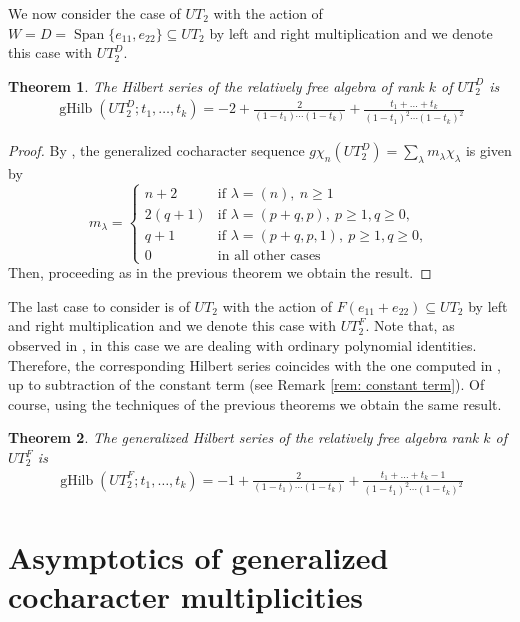 \documentclass{article}
\newtheorem{theorem}{Theorem}[section]
\DeclareMathOperator{\spn}{Span}
\DeclareMathOperator{\Hilb}{gHilb}
\begin{document}
We now consider the case of $UT_2$ with the action of $W=D=\spn\{e_{11},e_{22}\}\subseteq UT_2$ by left and right multiplication and we denote this case with $UT_2^D$.

\begin{theorem}
	The Hilbert series of the relatively free algebra of rank $k$ of $UT_2^D$ is \begin{gather*}
		\Hilb(UT_2^D; t_1,\dots,t_k) = -2 +\frac{2}{(1-t_1)\cdots (1-t_k)} + \frac{t_1+\ldots +t_k }{(1-t_1)^2\cdots (1-t_k)^2}
	\end{gather*}
\end{theorem}
\begin{proof}
	By \cite[Theorem 5.2]{MR25a}, the generalized cocharacter sequence $g\chi_n(UT_2^D)=\sum_\lambda m_\lambda \chi_\lambda$ is given by
	\[ m_\lambda = \begin{cases}
		n+2 &\text{if } \lambda = (n),\ n\geq 1 \\
		2(q+1) &\text{if } \lambda = (p+q,p),\ p\geq1, q\geq 0, \\
		q+1 &\text{if } \lambda = (p+q,p,1),\ p\geq1, q\geq 0, \\
		0 &\text{in all other cases}
	\end{cases} \]
	Then, proceeding as in the previous theorem we obtain the result.
\end{proof}

The last case to consider is of $UT_2$ with the action of $F(e_{11}+e_{22})\subseteq UT_2$ by left and right multiplication and we denote this case with $UT_2^F$. Note that, as observed in \cite[Section 5]{MR25a}, in this case we are dealing with ordinary polynomial identities. Therefore, the corresponding Hilbert series coincides with the one computed in \cite[Theorem 12]{BD12}, up to subtraction of the constant term (see Remark \ref{rem: constant term}). Of course, using the techniques of the previous theorems we obtain the same result.

\begin{theorem}
	The generalized Hilbert series of the relatively free algebra rank $k$ of $UT_2^F$ is \begin{gather*}
		\Hilb(UT_2^F; t_1,\dots,t_k) = -1 +\frac{2}{(1-t_1)\cdots (1-t_k)} + \frac{t_1+\ldots +t_k -1}{(1-t_1)^2\cdots (1-t_k)^2}
	\end{gather*}
\end{theorem}

\section{Asymptotics of generalized cocharacter multiplicities}
\end{document}
